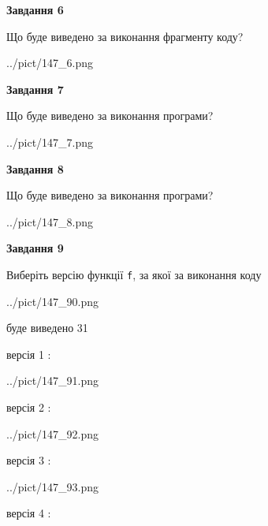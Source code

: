 \documentclass[12pt, ukrainian]{article}
\def\code#1{\Verb!#1!}
\begin{document}
{\begin {large}
{\begin {center}\textbf{Завдання 6}\end {center}}

Що буде виведено за виконання фрагменту коду?\par
\begin{center}
	{../pict/147_6.png}
\end{center}
\newpage

{\begin {center}\textbf{Завдання 7}\end {center}}

Що буде виведено за виконання програми?\par
\begin{center}
	{../pict/147_7.png}
\end{center}
\newpage

{\begin {center}\textbf{Завдання 8}\end {center}}

Що буде виведено за виконання програми?\par
\begin{center}
	{../pict/147_8.png}
\end{center}
\newpage

{\begin {center}\textbf{Завдання 9}\end {center}}

Виберіть версію функції \code{f}, за якої за виконання коду
\begin{center}
	{../pict/147_90.png}
\end{center}
буде виведено 31

\vspace{5mm}
версія 1 :

\begin{center}
	{../pict/147_91.png}
\end{center}
версія 2 :

\begin{center}
	{../pict/147_92.png}
\end{center}
версія 3 :

\begin{center}
	{../pict/147_93.png}
\end{center}
версія 4 :


\end{large}}
\end{document}

